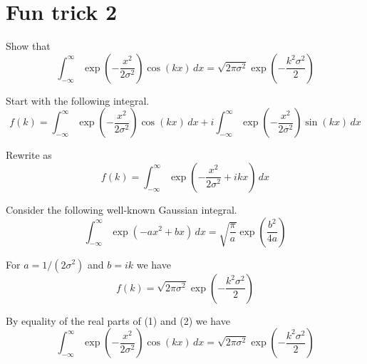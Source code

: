 

\section*{Fun trick 2}

Show that
\begin{equation*}
\int_{-\infty}^\infty
\exp\left(-\frac{x^2}{2\sigma^2}\right)\cos(kx)\,dx
=\sqrt{2\pi\sigma^2}\exp\left(-\frac{k^2\sigma^2}{2}\right)
\end{equation*}

Start with the following integral.
\begin{equation*}
f(k)=\int_{-\infty}^\infty\exp\left(-\frac{x^2}{2\sigma^2}\right)\cos(kx)\,dx
+i\int_{-\infty}^\infty\exp\left(-\frac{x^2}{2\sigma^2}\right)\sin(kx)\,dx
\tag{1}
\end{equation*}

Rewrite as
\begin{equation*}
f(k)=\int_{-\infty}^\infty\exp\left(-\frac{x^2}{2\sigma^2}+ikx\right)\,dx
\end{equation*}

Consider the following well-known Gaussian integral.
\begin{equation*}
\int_{-\infty}^\infty\exp(-ax^2+bx)\,dx=\sqrt{\frac{\pi}{a}}\exp\left(\frac{b^2}{4a}\right)
\end{equation*}

For $a=1/(2\sigma^2)$ and $b=ik$ we have
\begin{equation*}
f(k)=\sqrt{2\pi\sigma^2}\exp\left(-\frac{k^2\sigma^2}{2}\right)
\tag{2}
\end{equation*}

By equality of the real parts of (1) and (2) we have
\begin{equation*}
\int_{-\infty}^\infty\exp\left(-\frac{x^2}{2\sigma^2}\right)\cos(kx)\,dx
=\sqrt{2\pi\sigma^2}\exp\left(-\frac{k^2\sigma^2}{2}\right)
\end{equation*}


